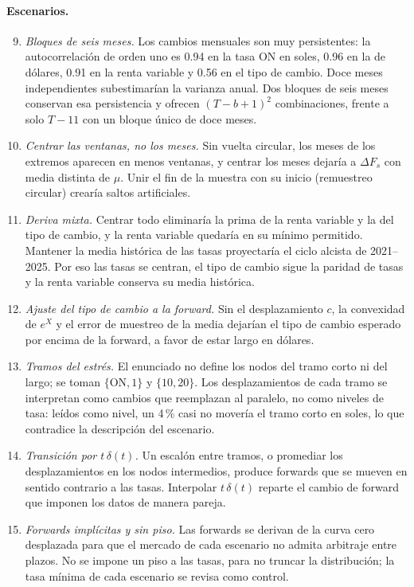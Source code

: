 \paragraph{Escenarios.}
\begin{enumerate}\setcounter{enumi}{8}
  \item \emph{Bloques de seis meses.} Los cambios mensuales son muy persistentes: la autocorrelación de orden uno
  es 0.94 en la tasa ON en soles, 0.96 en la de dólares, 0.91 en la renta variable y 0.56 en el tipo de cambio.
  Doce meses independientes subestimarían la varianza anual. Dos bloques de seis meses conservan esa persistencia
  y ofrecen $(T-b+1)^2$ combinaciones, frente a solo $T-11$ con un bloque único de doce meses.
  \item \emph{Centrar las ventanas, no los meses.} Sin vuelta circular, los meses de los extremos aparecen en menos
  ventanas, y centrar los meses dejaría a $\Delta F_s$ con media distinta de $\mu$. Unir el fin de la muestra con
  su inicio (remuestreo circular) crearía saltos artificiales.
  \item \emph{Deriva mixta.} Centrar todo eliminaría la prima de la renta variable y la del tipo de cambio, y la renta
  variable quedaría en su mínimo permitido. Mantener la media histórica de las tasas proyectaría el ciclo alcista
  de 2021--2025. Por eso las tasas se centran, el tipo de cambio sigue la paridad de tasas y la renta variable
  conserva su media histórica.
  \item \emph{Ajuste del tipo de cambio a la forward.} Sin el desplazamiento $c$, la convexidad de $e^{X}$ y el error
  de muestreo de la media dejarían el tipo de cambio esperado por encima de la forward, a favor de estar largo en
  dólares.
  \item \emph{Tramos del estrés.} El enunciado no define los nodos del tramo corto ni del largo; se toman
  $\{\text{ON}, 1\}$ y $\{10, 20\}$. Los desplazamientos de cada tramo se interpretan como cambios que reemplazan al
  paralelo, no como niveles de tasa: leídos como nivel, un 4\,\% casi no movería el tramo corto en soles, lo que
  contradice la descripción del escenario.
  \item \emph{Transición por $t\,\delta(t)$.} Un escalón entre tramos, o promediar los desplazamientos en los nodos
  intermedios, produce forwards que se mueven en sentido contrario a las tasas. Interpolar $t\,\delta(t)$ reparte el
  cambio de forward que imponen los datos de manera pareja.
  \item \emph{Forwards implícitas y sin piso.} Las forwards se derivan de la curva cero desplazada para que el
  mercado de cada escenario no admita arbitraje entre plazos. No se impone un piso a las tasas, para no
  truncar la distribución; la tasa mínima de cada escenario se revisa como control.
\end{enumerate}

